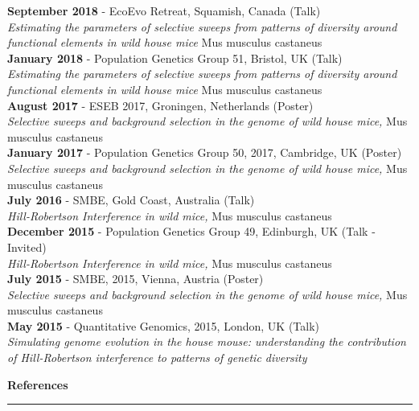 \documentclass[11pt]{article}
\newcommand{\makeheadingGeneric}[2][]%
        {\hspace*{-\marginparsep minus \marginparwidth}%
         \begin{minipage}[t]{\textwidth+\marginparwidth+\marginparsep}%
             {\large \bfseries #2 \hfill #1}\\[-0.15\baselineskip]%
                 \rule{\columnwidth}{1pt}%
         \end{minipage}}
\newcommand{\blankline}{\quad\pagebreak[2]}
\begin{document}
{\bf September 2018} - EcoEvo Retreat, Squamish, Canada (Talk) \\
\emph{Estimating the parameters of selective sweeps from patterns of diversity around functional elements in wild house mice} Mus musculus castaneus\\

{\bf January 2018} - Population Genetics Group 51, Bristol, UK (Talk) \\
\emph{Estimating the parameters of selective sweeps from patterns of diversity around functional elements in wild house mice} Mus musculus castaneus\\

{\bf August 2017} - ESEB 2017, Groningen, Netherlands (Poster) \\
\emph{Selective sweeps and background selection in the genome of wild house mice,} Mus musculus castaneus \\

{\bf January 2017} - Population Genetics Group 50, 2017, Cambridge, UK (Poster) \\
\emph{Selective sweeps and background selection in the genome of wild house mice,} Mus musculus castaneus \\

{\bf July 2016} - SMBE, Gold Coast, Australia (Talk) \\
\emph{Hill-Robertson Interference in wild mice,} Mus musculus castaneus\\

{\bf December 2015} - Population Genetics Group 49, Edinburgh, UK (Talk - Invited) \\
\emph{Hill-Robertson Interference in wild mice,} Mus musculus castaneus\\


{\bf July 2015} - SMBE, 2015, Vienna, Austria (Poster) \\
\emph{Selective sweeps and background selection in the genome of wild house mice,} Mus musculus castaneus \\

{\bf May 2015} - Quantitative Genomics, 2015, London, UK (Talk) \\
\emph{Simulating genome evolution in the house mouse: understanding the contribution of Hill-Robertson interference to patterns of genetic diversity} \\


\pagebreak

\makeheadingGeneric{References}

\blankline
\end{document}
